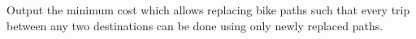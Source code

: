 
    Output the minimum cost which allows replacing bike paths such that every trip between any two destinations can be done using only newly replaced paths.
